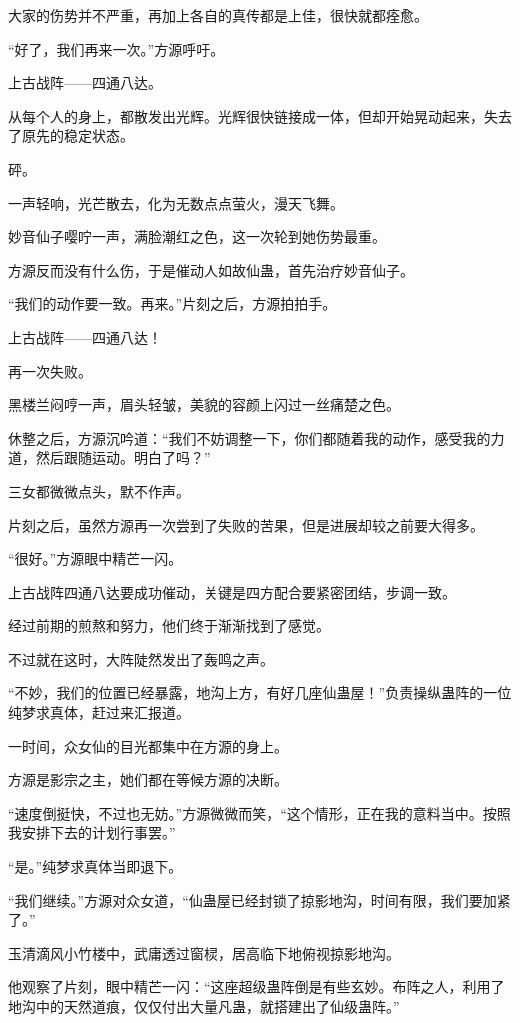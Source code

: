 \begin{this_body}
大家的伤势并不严重，再加上各自的真传都是上佳，很快就都痊愈。

“好了，我们再来一次。”方源呼吁。

上古战阵——四通八达。

从每个人的身上，都散发出光辉。光辉很快链接成一体，但却开始晃动起来，失去了原先的稳定状态。

砰。

一声轻响，光芒散去，化为无数点点萤火，漫天飞舞。

妙音仙子嘤咛一声，满脸潮红之色，这一次轮到她伤势最重。

方源反而没有什么伤，于是催动人如故仙蛊，首先治疗妙音仙子。

“我们的动作要一致。再来。”片刻之后，方源拍拍手。

上古战阵——四通八达！

再一次失败。

黑楼兰闷哼一声，眉头轻皱，美貌的容颜上闪过一丝痛楚之色。

休整之后，方源沉吟道：“我们不妨调整一下，你们都随着我的动作，感受我的力道，然后跟随运动。明白了吗？”

三女都微微点头，默不作声。

片刻之后，虽然方源再一次尝到了失败的苦果，但是进展却较之前要大得多。

“很好。”方源眼中精芒一闪。

上古战阵四通八达要成功催动，关键是四方配合要紧密团结，步调一致。

经过前期的煎熬和努力，他们终于渐渐找到了感觉。

不过就在这时，大阵陡然发出了轰鸣之声。

“不妙，我们的位置已经暴露，地沟上方，有好几座仙蛊屋！”负责操纵蛊阵的一位纯梦求真体，赶过来汇报道。

一时间，众女仙的目光都集中在方源的身上。

方源是影宗之主，她们都在等候方源的决断。

“速度倒挺快，不过也无妨。”方源微微而笑，“这个情形，正在我的意料当中。按照我安排下去的计划行事罢。”

“是。”纯梦求真体当即退下。

“我们继续。”方源对众女道，“仙蛊屋已经封锁了掠影地沟，时间有限，我们要加紧了。”

玉清滴风小竹楼中，武庸透过窗棂，居高临下地俯视掠影地沟。

他观察了片刻，眼中精芒一闪：“这座超级蛊阵倒是有些玄妙。布阵之人，利用了地沟中的天然道痕，仅仅付出大量凡蛊，就搭建出了仙级蛊阵。”


\end{this_body}
